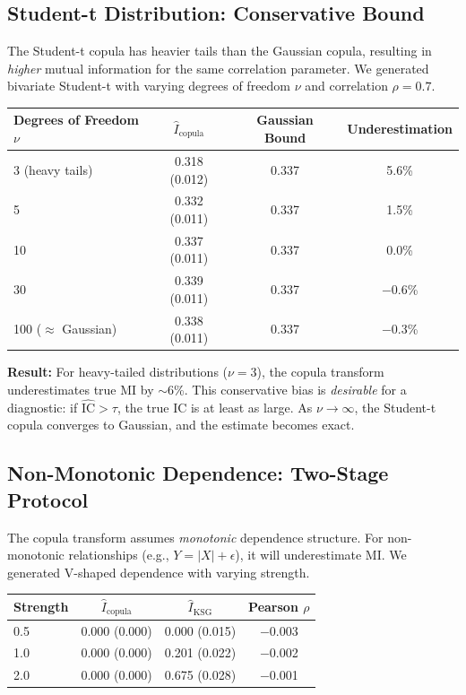 \documentclass[10pt]{article} %
\theoremstyle{plain}
\theoremstyle{definition}
\newcommand{\IC}{\mathrm{IC}}  %
\newcommand{\MI}{I}
\begin{document}
\subsection{Student-t Distribution: Conservative Bound}

The Student-t copula has heavier tails than the Gaussian copula, resulting in \emph{higher} mutual information for the same correlation parameter. We generated bivariate Student-t with varying degrees of freedom $\nu$ and correlation $\rho = 0.7$.

\begin{center}
\begin{tabular}{lccc}
\toprule
Degrees of Freedom $\nu$ & $\widehat{\MI}_{\text{copula}}$ & Gaussian Bound & Underestimation \\
\midrule
3 (heavy tails) & 0.318 (0.012) & 0.337 & 5.6\% \\
5 & 0.332 (0.011) & 0.337 & 1.5\% \\
10 & 0.337 (0.011) & 0.337 & 0.0\% \\
30 & 0.339 (0.011) & 0.337 & $-$0.6\% \\
100 ($\approx$ Gaussian) & 0.338 (0.011) & 0.337 & $-$0.3\% \\
\bottomrule
\end{tabular}
\end{center}

\textbf{Result:} For heavy-tailed distributions ($\nu = 3$), the copula transform underestimates true MI by $\sim$6\%. This conservative bias is \emph{desirable} for a diagnostic: if $\widehat{\IC} > \tau$, the true IC is at least as large. As $\nu \to \infty$, the Student-t copula converges to Gaussian, and the estimate becomes exact.

\subsection{Non-Monotonic Dependence: Two-Stage Protocol}

The copula transform assumes \emph{monotonic} dependence structure. For non-monotonic relationships (e.g., $Y = |X| + \epsilon$), it will underestimate MI. We generated V-shaped dependence with varying strength.

\begin{center}
\begin{tabular}{lccc}
\toprule
Strength & $\widehat{\MI}_{\text{copula}}$ & $\widehat{\MI}_{\text{KSG}}$ & Pearson $\rho$ \\
\midrule
0.5 & 0.000 (0.000) & 0.000 (0.015) & $-$0.003 \\
1.0 & 0.000 (0.000) & 0.201 (0.022) & $-$0.002 \\
2.0 & 0.000 (0.000) & 0.675 (0.028) & $-$0.001 \\
\bottomrule
\end{tabular}
\end{center}
\end{document}
